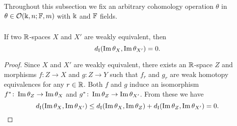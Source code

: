 Throughout this subsection we fix an arbitrary cohomology operation $\theta$ in $\theta \in \mathcal{O}(\Bbbk, n; \mathbb{F}, m)$ with $\Bbbk$ and $\mathbb{F}$ fields.



%
%

\subsubsection{}\label{lem:w.h.e. preservance}
\lemma If two $\mathbb{R}$-spaces $X$ and $X'$ are weakly equivalent, then
\[
d_{\mathrm{I}}(\operatorname{Im}\theta_{X},\operatorname{Im}\theta_{X'}) = 0.
\]

\begin{proof}
	Since $X$ and $X'$ are weakly equivalent, there exists an $\mathbb{R}$-space $Z$ and morphisms $f \colon Z \to X$ and $g \colon Z \to Y$ such that $f_r$ and $g_r$ are weak homotopy equivalences for any $r \in \mathbb{R}$.
	Both $f$ and $g$ induce an isomorphism $f^* \colon \operatorname{Im}\theta_{Z} \to \operatorname{Im}\theta_{X}$ and $g^* \colon \operatorname{Im}\theta_{Z} \to \operatorname{Im}\theta_{X'}$.
	From these we have
	\[
	d_{\mathrm{I}}(\operatorname{Im}\theta_{X},\operatorname{Im}\theta_{X'}) \leq
	d_{\mathrm{I}}(\operatorname{Im}\theta_{X},\operatorname{Im}\theta_{Z}) + d_{\mathrm{I}}(\operatorname{Im}\theta_{Z},\operatorname{Im}\theta_{X'}) =
	0.\qedhere
	\]
\end{proof}

